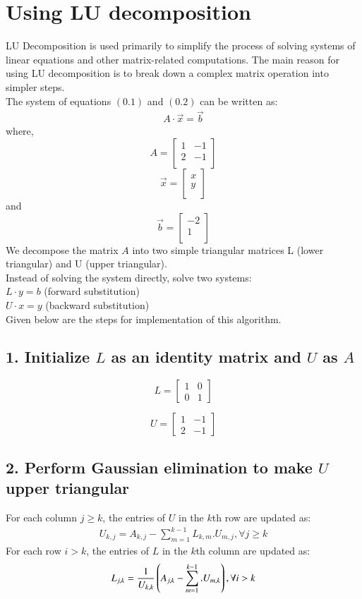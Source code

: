 \documentclass[journal]{IEEEtran}
\begin{document}
\section*{Using LU decomposition}
LU Decomposition is used primarily to simplify the process of solving systems of linear equations and other matrix-related computations. The main reason for using LU decomposition is to break down a complex matrix operation into simpler steps. \\
The system of equations $(0.1)$ and $(0.2)$ can be written as:
\begin{align}
    A \cdot \vec{x} =\vec{b}
\end{align}
where,\\
\[
A = 
\begin{bmatrix}
1 & -1 \\
2 & -1 \\
\end{bmatrix}
\]
\[
\vec{x} =
\begin{bmatrix}
    x\\
    y\\
\end{bmatrix}
\] and
\[
\vec{b}=
\begin{bmatrix}
-2\\
1\\
\end{bmatrix}
\]
We decompose the matrix $A$ into two simple triangular matrices L (lower triangular) and U (upper triangular).\\
Instead of solving the system directly, solve two systems:\\
$L\cdot y = b$ (forward substitution)\\
$U\cdot x = y$ (backward substitution)\\
Given below are the steps for implementation of this algorithm.
\subsection*{1. Initialize $ L$ as an identity matrix and $ U $ as $ A $}

\[
L =
\begin{bmatrix}
1 & 0 \\
0 & 1
\end{bmatrix}
\]

\[
U =
\begin{bmatrix}
1 & -1 \\
2 & -1
\end{bmatrix}
\]

\subsection*{2. Perform Gaussian elimination to make $ U $ upper triangular}
For each column $j \geq k$, the entries of $U$ in the $k$th row are updated as:
\begin{align}
    U_{k,j} = A_{k,j} - \sum_{m=1}^{k-1} L_{k,m}.U_{m,j},   \forall{j \geq k}
\end{align}
For each row $i > k$, the entries of $L$ in the $k$th column are updated as:
\begin{align}
    L_{j,k} = \frac{1}{U_{k,k}}\left(A_{j,k} - \sum_{m=1}^{k-1}.U_{m,k}\right), \forall{i>k}
\end{align}
\end{document}
